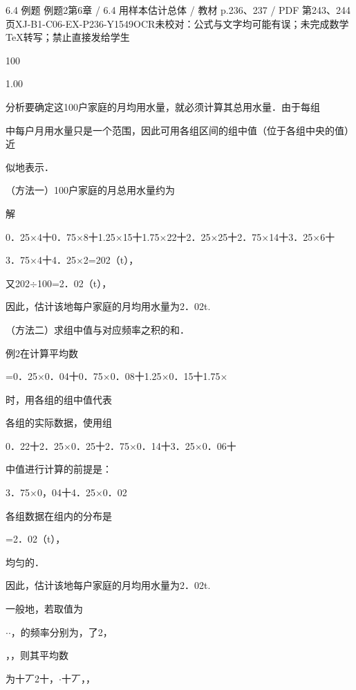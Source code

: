 \begin{bankitem}{6.4 例题 例题2}{第6章 / 6.4 用样本估计总体 / 教材 p.236、237 / PDF 第243、244页}{XJ-B1-C06-EX-P236-Y1549}{OCR未校对：公式与文字均可能有误；未完成数学TeX转写；禁止直接发给学生}
\begin{ocrdraft}
100
\par
1.00
\par
分析要确定这100户家庭的月均用水量，就必须计算其总用水量．由于每组
\par
中每户月用水量只是一个范围，因此可用各组区间的组中值（位于各组中央的值）近
\par
似地表示．
\par
（方法一）100户家庭的月总用水量约为
\par
解
\par
0．25\ensuremath{\times}4十0．75\ensuremath{\times}8十1.25\ensuremath{\times}15十1.75\ensuremath{\times}22十2．25\ensuremath{\times}25十2．75\ensuremath{\times}14十3．25\ensuremath{\times}6十
\par
3．75\ensuremath{\times}4十4．25\ensuremath{\times}2=202（t），
\par
又202\ensuremath{\div}100=2．02（t），
\par
因此，估计该地每户家庭的月均用水量为2．02t.
\par
（方法二）求组中值与对应频率之积的和．
\par
例2在计算平均数
\par
=0．25\ensuremath{\times}0．04十0．75\ensuremath{\times}0．08十1.25\ensuremath{\times}0．15十1.75\ensuremath{\times}
\par
时，用各组的组中值代表
\par
各组的实际数据，使用组
\par
0．22十2．25\ensuremath{\times}0．25十2．75\ensuremath{\times}0．14十3．25\ensuremath{\times}0．06十
\par
中值进行计算的前提是：
\par
3．75\ensuremath{\times}0，04十4．25\ensuremath{\times}0．02
\par
各组数据在组内的分布是
\par
=2．02（t），
\par
均匀的．
\par
因此，估计该地每户家庭的月均用水量为2．02t.
\par
一般地，若取值为
\par
\ensuremath{\cdot}\ensuremath{\cdot}，的频率分别为，了2，
\par
，，则其平均数
\par
为十丆2十，\ensuremath{\cdot}十丆，，
\end{ocrdraft}
\end{bankitem}
